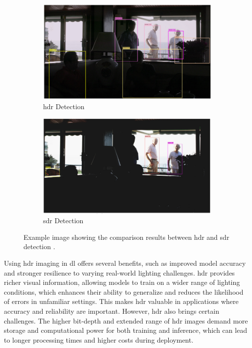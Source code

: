 \begin{figure}[!ht]
    \centering
    \begin{subfigure}[b]{0.45\textwidth}
        \centering
        \includegraphics[width=\textwidth]{Figures/HDR.PNG}
        \caption{\gls{hdr} Detection}
        \label{HDR}
    \end{subfigure}
    \hfill
    \begin{subfigure}[b]{0.45\textwidth}
        \centering
        \includegraphics[width=\textwidth]{Figures/SDR.PNG}
        \caption{\gls{sdr} Detection}
        \label{SDR}
    \end{subfigure}
    
    \caption{Example image showing the comparison results between \gls{hdr} and \gls{sdr} detection \cite{HDR}.}
    \label{fig:HDR vs SDR}
\end{figure}

Using \gls{hdr} imaging in \gls{dl} offers several benefits, such as improved model accuracy and stronger resilience to varying real-world lighting challenges. \gls{hdr} provides richer visual information, allowing models to train on a wider range of lighting conditions, which enhances their ability to generalize and reduces the likelihood of errors in unfamiliar settings. This makes \gls{hdr} valuable in applications where accuracy and reliability are important. However, \gls{hdr} also brings certain challenges. The higher bit-depth and extended range of \gls{hdr} images demand more storage and computational power for both training and inference, which can lead to longer processing times and higher costs during deployment.

